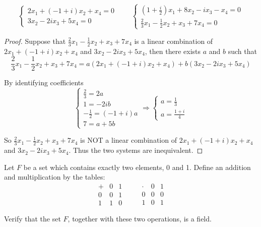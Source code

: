 \begin{exercise}
    \[
        \begin{cases}
            2x_{1} + (-1 + i)x_{2} + x_{4} = 0 \\
            3x_{2} - 2i x_{3} + 5x_{4} = 0
        \end{cases}
        \qquad
        \begin{cases}
            \left(1 + \frac{i}{2}\right)x_{1} + 8x_{2} - i x_{3} - x_{4} = 0 \\
            \frac{2}{3}x_{1} - \frac{1}{2}x_{2} + x_{3} + 7x_{4} = 0
        \end{cases}
    \]
\end{exercise}

\begin{proof}
    Suppose that $\frac{2}{3}x_{1} - \frac{1}{2}x_{2} + x_{3} + 7x_{4}$ is a linear combination of $2x_{1} + (-1 + i)x_{2} + x_{4}$ and $3x_{2} - 2i x_{3} + 5x_{4}$, then there exists $a$ and $b$ such that
    \[
        \frac{2}{3}x_{1} - \frac{1}{2}x_{2} + x_{3} + 7x_{4} = a(2x_{1} + (-1 + i)x_{2} + x_{4}) + b(3x_{2} - 2i x_{3} + 5x_{4})
    \]

    By identifying coefficients
    \[
        \begin{cases}
            \frac{2}{3} = 2a         \\
            1 = -2i b                \\
            -\frac{1}{2} = (-1 + i)a \\
            7 = a + 5b
        \end{cases}
        \Longrightarrow
        \begin{cases}
            a = \frac{1}{3} \\
            a = \frac{1 + i}{4}
        \end{cases}
    \]

    So $\frac{2}{3}x_{1} - \frac{1}{2}x_{2} + x_{3} + 7x_{4}$ is NOT a linear combination of $2x_{1} + (-1 + i)x_{2} + x_{4}$ and $3x_{2} - 2i x_{3} + 5x_{4}$. Thus the two systems are inequivalent.
\end{proof}

\begin{exercise}
    Let $F$ be a set which contains exactly two elements, 0 and 1. Define an addition and multiplication by the tables:
    \[
        \begin{array}{c|cc}
            + & 0 & 1 \\
            \hline
            0 & 0 & 1 \\
            1 & 1 & 0
        \end{array}
        \qquad
        \begin{array}{c|cc}
            \cdot & 0 & 1 \\
            \hline
            0     & 0 & 0 \\
            1     & 0 & 1
        \end{array}
    \]

    Verify that the set $F$, together with these two operations, is a field.
\end{exercise}

